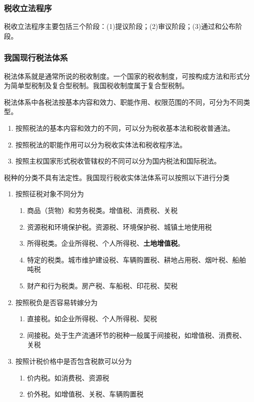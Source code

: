 \documentclass[UTF8,12pt]{ctexart}
\numberwithin{equation}{section} %
\numberwithin{figure}{section}
\numberwithin{table}{section}
\begin{document}
	\subsubsection{税收立法程序}
	税收立法程序主要包括三个阶段：(1)提议阶段；(2)审议阶段；(3)通过和公布阶段。
	
	\subsubsection{我国现行税法体系}
	税法体系就是通常所说的税收制度。一个国家的税收制度，可按构成方法和形式分为简单型税制及复合型税制。我国税收制度属于复合型税制。
	
	税法体系中各税法按基本内容和效力、职能作用、权限范围的不同，可分为不同类型。
	\begin{enumerate}
		\item 按照税法的基本内容和效力的不同，可以分为税收基本法和税收普通法。
		
		\item 按照税法的职能作用可以分为税收实体法和税收程序法。
		
		\item 按照主权国家形式税收管辖权的不同可以分为国内税法和国际税法。 
	\end{enumerate}
	
	税种的分类不具有法定性。我国现行税收实体法体系可以按照以下进行分类
	\begin{enumerate}
		\item 按照征税对象不同分为
		\begin{enumerate}
			\item 商品（货物）和劳务税类。增值税、消费税、关税
			
			\item 资源税和环境保护税。资源税、环境保护税、城镇土地使用税
			
			\item 所得税类。企业所得税、个人所得税、\textbf{土地增值税}。
			
			\item 特定的税类。城市维护建设税、车辆购置税、耕地占用税、烟叶税、船舶吨税 
			
			\item 财产和行为税类。房产税、车船税、印花税、契税
		\end{enumerate}
		
		\item 按照税负是否容易转嫁分为
		\begin{enumerate}
			\item 直接税。如企业所得税、个人所得税、契税
			
			\item 间接税。处于生产流通环节的税种一般属于间接税，如增值税、消费税、关税
		\end{enumerate}
		
		\item 按照计税价格中是否包含税款可以分为
		\begin{enumerate}
			\item 价内税。如消费税、资源税
			
			\item 价外税。如增值税、关税、车辆购置税
		\end{enumerate}
	\end{enumerate}
	
\end{document}
